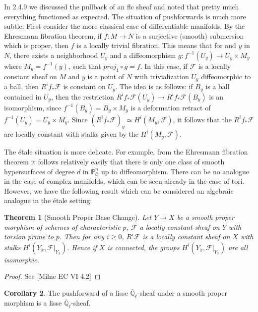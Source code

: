 \documentclass{ucbthesis}
\newtheorem{thm}{Theorem}[section]
\theoremstyle{definition}
\theoremstyle{theorem}
\newtheorem{cor}[thm]{Corollary}
\begin{document}
In 2.4.9 we discussed the pullback of an flc sheaf and noted that pretty much everything functioned as expected. The situation of pushforwards is much more subtle.  First consider the more classical case of differentiable manifolds. By the Ehresmann fibration theorem, if $f:M\rightarrow N$ is a surjective (smooth) submersion which is proper, then $f$ is a locally trivial fibration. This means that for and $y$ in $N$, there exists a neighborhood $U_{y}$ and a diffeomorphism $g:f^{-1}(U_{y}) \rightarrow U_{y} \times M_{y}$ where $M_{y} = f^{-1}(y)$, such that $proj_{1}\circ g = f$. In this case, if $\mathcal{F}$ is a locally constant sheaf on $M$ and $y$ is a point of $N$ with trivialization $U_{y}$ diffeomorphic to a ball, then $R^{i}f_{*}\mathcal{F}$ is constant on $U_{y}$. The idea is as follows: if $B_{y}$ is a ball contained in $U_{y}$, then the restriction $R^{i}f_{*}\mathcal{F}(U_y) \rightarrow R^{i}f_{*}\mathcal{F}(B_y)$ is an isomorphism, since  $f^{-1}(B_y)=B_{y}\times M_{y}$ is a deformation retract of $f^{-1}(U_y)=U_{y}\times M_{y}$. Since $(R^{i}f_{*}\mathcal{F})_{y} \simeq H^{i}(M_y,\mathcal{F})$, it follows that the $R^{i}f_{*}\mathcal{F}$ are locally constant with stalks given by the $H^{i}(M_{y},\mathcal{F})$. 

The \'{e}tale situation is more delicate. For example, from the Ehresmann fibration theorem it follows relatively easily that there is only one class of smooth hypersurfaces of degree $d$ in $\mathbb{P}^{n}_{\mathcal{C}}$ up to diffeomorphism. There can be no analogue in the case of complex manifolds, which can be seen already in the case of tori. However, we have the following result which can be considered an algebraic analogue in the \'{e}tale setting:

\begin{thm}[Smooth Proper Base Change]
Let $Y\rightarrow X$ be a smooth proper morphism of schemes of characteristic $p$, $\mathcal{F}$ a locally constant sheaf on $Y$ with torsion prime to $p$. Then for any $i \geq 0$, $R^{i}\mathcal{F}$ is a locally constant sheaf on $X$ with stalks $H^{i}(Y_{\bar{x}},\mathcal{F}|_{Y_{\bar{x}}})$. Hence if $X$ is connected, the groups  $H^{i}(Y_{\bar{x}},\mathcal{F}|_{Y_{\bar{x}}})$ are all isomorphic. 
\end{thm}
\begin{proof}
See [Milne EC VI 4.2]
\end{proof}

\begin{cor}
The pushforward of a lisse $\overline{\mathbb{Q}}_{\ell}$-sheaf under a smooth proper morphism is a lisse $\overline{\mathbb{Q}}_{\ell}$-sheaf. 
\end{cor}
\end{document}
